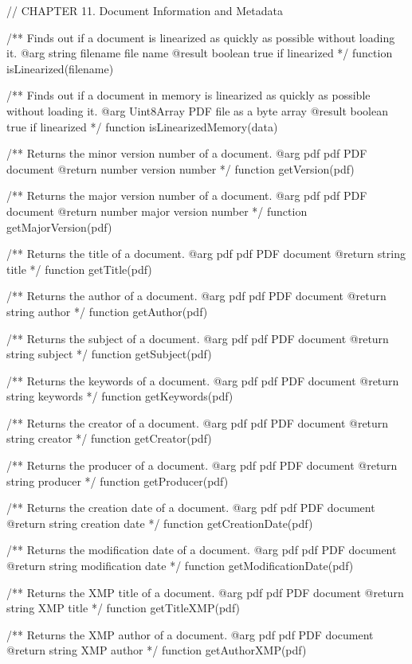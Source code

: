 // CHAPTER 11. Document Information and Metadata

/** Finds out if a document is linearized as quickly as possible without
loading it.
@arg {string} filename file name
@result {boolean} true if linearized */
function isLinearized(filename) {}

/** Finds out if a document in memory is linearized as quickly as possible without
loading it.
@arg {Uint8Array} PDF file as a byte array
@result {boolean} true if linearized */
function isLinearizedMemory(data) {}

/** Returns the minor version number of a document.
@arg {pdf} pdf PDF document
@return {number} version number */
function getVersion(pdf) {}

/** Returns the major version number of a document.
@arg {pdf} pdf PDF document
@return {number} major version number */
function getMajorVersion(pdf) {}

/** Returns the title of a document.
@arg {pdf} pdf PDF document
@return {string} title */
function getTitle(pdf) {}

/** Returns the author of a document.
@arg {pdf} pdf PDF document
@return {string} author */
function getAuthor(pdf) {}

/** Returns the subject of a document.
@arg {pdf} pdf PDF document
@return {string} subject */
function getSubject(pdf) {}

/** Returns the keywords of a document.
@arg {pdf} pdf PDF document
@return {string} keywords */
function getKeywords(pdf) {}

/** Returns the creator of a document.
@arg {pdf} pdf PDF document
@return {string} creator */
function getCreator(pdf) {}

/** Returns the producer of a document.
@arg {pdf} pdf PDF document
@return {string} producer */
function getProducer(pdf) {}

/** Returns the creation date of a document.
@arg {pdf} pdf PDF document
@return {string} creation date */
function getCreationDate(pdf) {}

/** Returns the modification date of a document.
@arg {pdf} pdf PDF document
@return {string} modification date */
function getModificationDate(pdf) {}

/** Returns the XMP title of a document.
@arg {pdf} pdf PDF document
@return {string} XMP title */
function getTitleXMP(pdf) {}

/** Returns the XMP author of a document.
@arg {pdf} pdf PDF document
@return {string} XMP author */
function getAuthorXMP(pdf) {}

